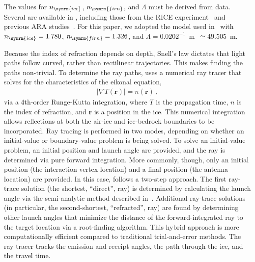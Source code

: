             The values for $n_{\symrm{ice}}$, $n_{\symrm{firn}}$, and $\Lambda$
            must be derived from data.
            Several are available in \arasim{}, including those from the RICE experiment~\citep{ice_rice} and
            previous ARA studies~\citep{ara_a23, ara_pa_analysis}.
            For this paper, we adopted the model used in~\citep{ara_pa_analysis} with $n_{\symrm{ice}} = 1.780$, $n_{\symrm{firn}} = 1.326$, and $\Lambda = 0.0202^{-1}$~m~$\simeq 49.505$~m.

            Because the index of refraction depends on depth,
            Snell's law dictates that light paths follow curved, rather than rectilinear trajectories.
            This makes finding the paths non-trivial.
            To determine the ray paths, \arasim{} uses a numerical ray tracer that solves for the characteristics of the eikonal equation,
            \begin{align}
                \lvert \nabla T(\mathbf{r}) \rvert = n(\mathbf{r})~,
            \end{align}
            via a 4th-order Runge-Kutta integration, where $T$ is the propagation time, $n$ is the index of refraction, and $\mathbf{r}$ is a position in the ice.
            This numerical integration allows reflections at both the air-ice and ice-bedrock boundaries to be incorporated.
            Ray tracing is performed in two modes, depending on whether an initial-value or boundary-value problem is being solved.
            To solve an initial-value problem, an initial position and launch angle are provided, and the ray is determined via pure forward integration.
            More commonly, though, only an initial position (the interaction vertex location) and a final position (the antenna location) are provided.
            In this case, \arasim{} follows a two-step approach.
            The first ray-trace solution (the shortest, ``direct'', ray) is determined by calculating the launch angle via the semi-analytic method described in~\citep{ara_testbed}.
            Additional ray-trace solutions (in particular, the second-shortest, ``refracted'', ray) are found by determining other launch angles that minimize the distance of the forward-integrated ray to the target location via a root-finding algorithm.
            This hybrid approach is more computationally efficient compared to traditional trial-and-error methods.
            The ray tracer tracks the emission and receipt angles, 
            the path through the ice, and the travel time.
    
